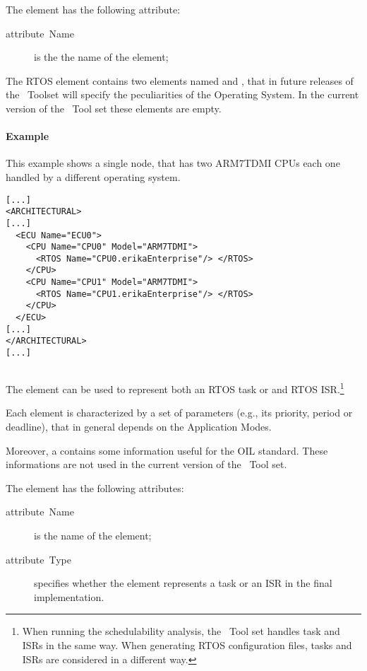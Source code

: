 The  element has the following attribute:

\begin{description}
\item [{attribute~Name}] is the the name of the  element;
\end{description}

The RTOS element contains two elements named  and
, that in future releases of the \rtd\ Toolset will
specify the peculiarities of the Operating System. In the current
version of the \rtd\ Tool set these elements are empty.


\paragraph{Example}

This example shows a single  node, that has two ARM7TDMI
CPUs each one handled by a different operating system.

\begin{lstlisting}
[...]
<ARCHITECTURAL>
[...]
  <ECU Name="ECU0">
    <CPU Name="CPU0" Model="ARM7TDMI">
      <RTOS Name="CPU0.erikaEnterprise"/> </RTOS>
    </CPU>
    <CPU Name="CPU1" Model="ARM7TDMI">
      <RTOS Name="CPU1.erikaEnterprise"/> </RTOS>
    </CPU>
  </ECU>
[...]
</ARCHITECTURAL>
[...]
\end{lstlisting}

\subsection{}

The  element can be used to represent both an RTOS task or
and RTOS ISR.\footnote{When running the schedulability analysis, the
  \rtd\ Tool set handles task and ISRs in the same way.  When
  generating RTOS configuration files, tasks and ISRs are considered
  in a different way.}

Each  element is characterized by a set of parameters
(e.g., its priority, period or deadline), that in general depends on
the Application Modes.

Moreover, a  contains some information useful for the OIL
standard. These informations are not used in the current version of
the \rtd\ Tool set.

The  element has the following attributes:

\begin{description}
\item [{attribute~Name}] is the name of the  element;
\item [{attribute~Type}] specifies whether the  element
  represents a task or an ISR in the final implementation.
\end{description}

